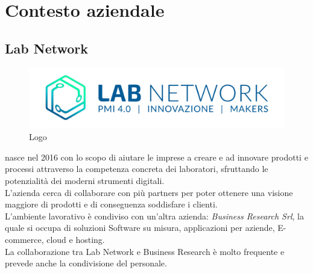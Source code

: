 
\chapter{Contesto aziendale}
\label{cap:introduzione}

\section{Lab Network}

\begin{figure}[H]
	\begin{center}
	\includegraphics[scale=0.4]{immagini/LOGO_LABNETWORK.png}
	\caption{Logo \lab{}}
	\end{center}
\end{figure}

\lab{} nasce nel 2016 con lo scopo di aiutare le imprese a creare e ad innovare prodotti e processi attraverso la competenza concreta dei laboratori, sfruttando le potenzialità dei moderni strumenti digitali.\\
L'azienda cerca di collaborare con più partners per poter ottenere una visione maggiore di prodotti e di conseguenza soddisfare i clienti.\\
L'ambiente lavorativo è condiviso con un'altra azienda: \textit{Business Research Srl}, la quale si occupa di soluzioni Software su misura, applicazioni per aziende, E-commerce, cloud e hosting.\\
La collaborazione tra Lab Network e Business Research è molto frequente e prevede anche la condivisione del personale.

